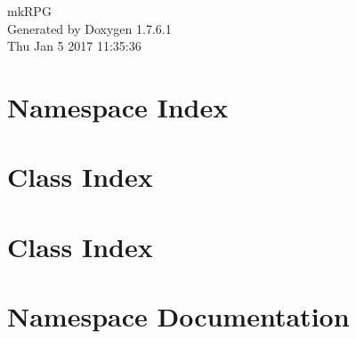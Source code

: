 \documentclass[a4paper]{book}
\begin{document}
\hypersetup{pageanchor=false,citecolor=blue}
\begin{titlepage}
\vspace*{7cm}
\begin{center}
{\Large mk\-R\-P\-G }\\
\vspace*{1cm}
{\large \-Generated by Doxygen 1.7.6.1}\\
\vspace*{0.5cm}
{\small Thu Jan 5 2017 11:35:36}\\
\end{center}
\end{titlepage}
\clearemptydoublepage
{}
\tableofcontents
\clearemptydoublepage
{}
\hypersetup{pageanchor=true,citecolor=blue}
\chapter{\-Namespace \-Index}

\chapter{\-Class \-Index}

\chapter{\-Class \-Index}

\chapter{\-Namespace \-Documentation}



































\end{document}
